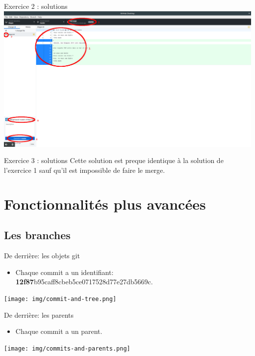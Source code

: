 \documentclass{beamer}
\begin{document}
\begin{frame}{Exercice 2 : solutions}
	\centering
    \includegraphics[scale=0.16]{img/image_exercices/conflic_resolv.png}
\end{frame}

\begin{frame}{Exercice 3 : solutions}
	Cette solution est preque identique à la solution de l'exercice 1 sauf qu'il est impossible de faire le merge.
\end{frame}

\section{Fonctionnalités plus avancées}

\subsection{Les branches}

\begin{frame}{De derrière: les objets git}
    \begin{itemize}
        \item Chaque commit a un identifiant: \textbf{12f87}b95caff8cbeb5ce0717528d77e27db5669c.
    \end{itemize}
    \begin{center}
    \texttt{[image: img/commit-and-tree.png]}
    \end{center}
\end{frame}

\begin{frame}{De derrière: les parents}
    \begin{itemize}
        \item Chaque commit a un parent.
    \end{itemize}
    \texttt{[image: img/commits-and-parents.png]}
\end{frame}
\end{document}
